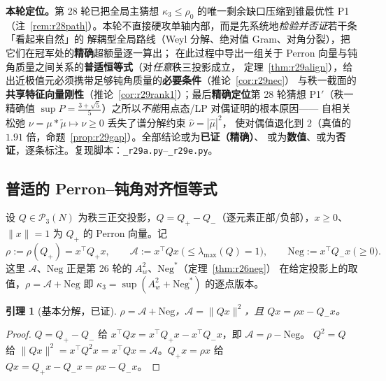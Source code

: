 \documentclass[UTF8,11pt]{ctexart}
\newtheorem{lemma}[theorem]{引理}
\theoremstyle{definition}
\begin{document}
\textbf{本轮定位。}第 28 轮已把全局主猜想 $\kappa_3\le\rho_0$ 的唯一剩余缺口压缩到锥最优性 P1
（注~\ref{rem:r28path}）。本轮不直接硬攻单轴内部，而是先系统地\emph{检验并否证}若干条「看起来自然」的
解耦型全局路线（Weyl 分解、绝对值 Gram、对角分裂），把它们在冠军处的\textbf{精确}超额量逐一算出；
在此过程中导出一组关于 Perron 向量与钝角质量之间关系的\textbf{普适恒等式}（对\emph{任意}秩三投影成立，
定理~\ref{thm:r29align}），给出近极值元必须携带足够钝角质量的\textbf{必要条件}（推论~\ref{cor:r29nec}）
与秩一截面的\textbf{共享特征向量刚性}（推论~\ref{cor:r29rank1}）；最后\textbf{精确定位}第 28 轮猜想
P1$'$（秩一精确值 $\sup P=\frac{3+\sqrt5}5$）之所以\emph{不能}用点态/LP 对偶证明的根本原因——
自相关松弛 $\nu=\mu*\widetilde\mu\mapsto\nu\ge0$ 丢失了谱分解约束 $\widehat\nu=|\widehat\mu|^2$，
使对偶值退化到 $2$（真值的 $1.91$ 倍，命题~\ref{prop:r29gap}）。全部结论或为\textbf{已证（精确）}、
或为\textbf{数值}、或为\textbf{否证}，逐条标注。复现脚本：\texttt{\_r29a.py}--\texttt{\_r29e.py}。

\subsection{普适的 Perron--钝角对齐恒等式}\label{sec:r29:ident}

设 $Q\in\mathcal P_3(N)$ 为秩三正交投影，$Q=Q_+-Q_-$（逐元素正部/负部），$x\ge0$、$\|x\|=1$
为 $Q_+$ 的 Perron 向量。记
\begin{equation}\label{eq:r29defs}
\rho:=\rho(Q_+)=x^\top Q_+x,\qquad
\mathcal A:=x^\top Qx\ \bigl(\le\lambda_{\max}(Q)=1\bigr),\qquad
\mathrm{Neg}:=x^\top Q_-x\ \bigl(\ge0\bigr).
\end{equation}
这里 $\mathcal A$、$\mathrm{Neg}$ 正是第 26 轮的 $A_w^2$、$\mathrm{Neg}^*$（定理~\ref{thm:r26neg}）
在给定投影上的取值，$\rho=\mathcal A+\mathrm{Neg}$ 即 $\kappa_3=\sup(A_w^2+\mathrm{Neg}^*)$ 的逐点版本。

\begin{lemma}[基本分解，已证]\label{lem:r29basic}
$\rho=\mathcal A+\mathrm{Neg}$，$\mathcal A=\|Qx\|^2$，且 $Qx=\rho x-Q_-x$。
\end{lemma}
\begin{proof}
$Q=Q_+-Q_-$ 给 $x^\top Qx=x^\top Q_+x-x^\top Q_-x$，即 $\mathcal A=\rho-\mathrm{Neg}$。
$Q^2=Q$ 给 $\|Qx\|^2=x^\top Q^2x=x^\top Qx=\mathcal A$。$Q_+x=\rho x$ 给
$Qx=Q_+x-Q_-x=\rho x-Q_-x$。
\end{proof}
\end{document}
